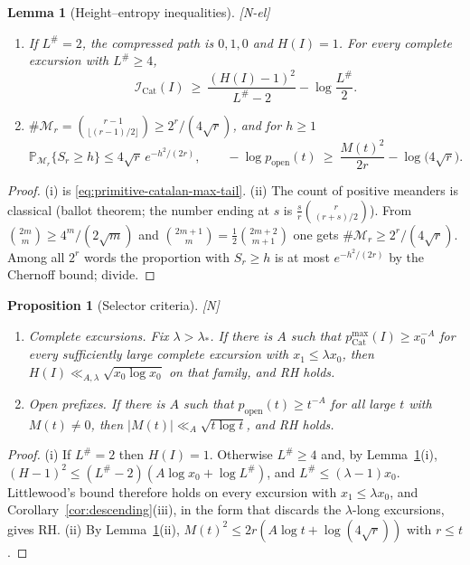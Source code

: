 \documentclass[11pt]{amsart}
\numberwithin{equation}{section}
\theoremstyle{plain}
\newtheorem{proposition}[theorem]{Proposition}
\newtheorem{lemma}[theorem]{Lemma}
\theoremstyle{definition}
\theoremstyle{remark}
\newcommand{\tagN}{\textup{[N]}}
\newcommand{\tagNE}{\textup{[N-el]}}
\begin{document}
\begin{lemma}[Height--entropy inequalities]
\label{lem:height-entropy}
\tagNE\ \begin{enumerate}[label=\textup{(\roman*)}]
\item If $L^\#=2$, the compressed path is $0,1,0$ and $H(I)=1$. For every
complete excursion with $L^\#\ge4$,
\[
\mathcal I_{\mathrm{Cat}}(I)\ \ge\ \frac{(H(I)-1)^2}{L^\#-2}-\log\frac{L^\#}2 .
\]
\item $\#\mathcal M_r=\binom{r-1}{\lfloor(r-1)/2\rfloor}\ge2^r/(4\sqrt r)$,
and for $h\ge1$
\[
\mathbb P_{\mathcal M_r}\{S_r\ge h\}\le4\sqrt r\,e^{-h^2/(2r)},
\qquad
-\log p_{\mathrm{open}}(t)\ \ge\ \frac{M(t)^2}{2r}-\log\bigl(4\sqrt r\bigr).
\]
\end{enumerate}
\end{lemma}

\begin{proof}
(i) is \eqref{eq:primitive-catalan-max-tail}. (ii) The count of positive
meanders is classical (ballot theorem; the number ending at $s$ is
$\frac sr\binom{r}{(r+s)/2}$). From
$\binom{2m}{m}\ge4^m/(2\sqrt m)$ and
$\binom{2m+1}{m}=\frac12\binom{2m+2}{m+1}$ one gets
$\#\mathcal M_r\ge2^r/(4\sqrt r)$. Among all $2^r$ words the proportion with
$S_r\ge h$ is at most $e^{-h^2/(2r)}$ by the Chernoff bound; divide.
\end{proof}

\begin{proposition}[Selector criteria]
\label{prop:selector-criteria}
\tagN\ \begin{enumerate}[label=\textup{(\roman*)}]
\item \emph{Complete excursions.} Fix $\lambda>\lambda_*$. If there is $A$
such that $p^{\max}_{\mathrm{Cat}}(I)\ge x_0^{-A}$ for every sufficiently
large complete excursion with $x_1\le\lambda x_0$, then
$H(I)\ll_{A,\lambda}\sqrt{x_0\log x_0}$ on that family, and RH holds.
\item \emph{Open prefixes.} If there is $A$ such that
$p_{\mathrm{open}}(t)\ge t^{-A}$ for all large $t$ with $M(t)\ne0$, then
$|M(t)|\ll_A\sqrt{t\log t}$, and RH holds.
\end{enumerate}
\end{proposition}

\begin{proof}
(i) If $L^\#=2$ then $H(I)=1$. Otherwise $L^\#\ge4$ and, by
Lemma~\ref{lem:height-entropy}(i), $(H-1)^2\le(L^\#-2)(A\log x_0+\log L^\#)$, and $L^\#\le(\lambda-1)x_0$.
Littlewood's bound therefore holds on every excursion with
$x_1\le\lambda x_0$, and Corollary~\ref{cor:descending}(iii), in the form
that discards the $\lambda$-long excursions, gives RH.
(ii) By Lemma~\ref{lem:height-entropy}(ii),
$M(t)^2\le2r(A\log t+\log(4\sqrt r))$ with $r\le t$.
\end{proof}
\end{document}
